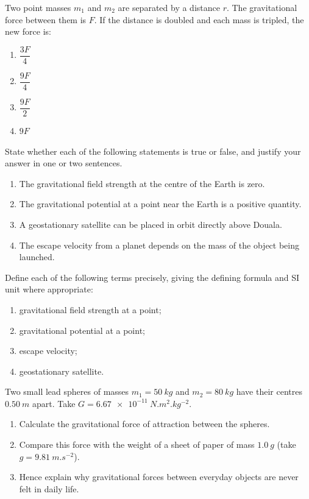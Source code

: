 \documentclass[11pt]{article}
\newcounter{popsec}
\newcounter{popsub}
\newcommand{\courssub}[1]{%
  \stepcounter{popsub}%
  \par\vspace{9pt}\noindent{\popxbold\fontsize{11.5}{13}\selectfont\color{popink}{\color{poporange}\thepopsec.\thepopsub}\hspace{6pt}#1}\par\nopagebreak\vspace{4pt}
}
\begin{document}
\courssub{I check my knowledge}

\begin{exercice}
Two point masses $m_1$ and $m_2$ are separated by a distance $r$. The gravitational force between them is $F$. If the distance is doubled and each mass is tripled, the new force is:
\begin{enumerate}
\item $\dfrac{3F}{4}$
\item $\dfrac{9F}{4}$
\item $\dfrac{9F}{2}$
\item $9F$
\end{enumerate}
\end{exercice}

\begin{exercice}
State whether each of the following statements is true or false, and justify your answer in one or two sentences.
\begin{enumerate}
\item The gravitational field strength at the centre of the Earth is zero.
\item The gravitational potential at a point near the Earth is a positive quantity.
\item A geostationary satellite can be placed in orbit directly above Douala.
\item The escape velocity from a planet depends on the mass of the object being launched.
\end{enumerate}
\end{exercice}

\begin{exercice}[Definitions]
Define each of the following terms precisely, giving the defining formula and SI unit where appropriate:
\begin{enumerate}
\item gravitational field strength at a point;
\item gravitational potential at a point;
\item escape velocity;
\item geostationary satellite.
\end{enumerate}
\end{exercice}

\begin{exercice}
Two small lead spheres of masses $m_1 = \SI{50}{kg}$ and $m_2 = \SI{80}{kg}$ have their centres $\SI{0.50}{m}$ apart. Take $G = \SI{6.67e-11}{N.m^2.kg^{-2}}$.
\begin{enumerate}
\item Calculate the gravitational force of attraction between the spheres.
\item Compare this force with the weight of a sheet of paper of mass $\SI{1.0}{g}$ (take $g = \SI{9.81}{m.s^{-2}}$).
\item Hence explain why gravitational forces between everyday objects are never felt in daily life.
\end{enumerate}
\end{exercice}
\end{document}
